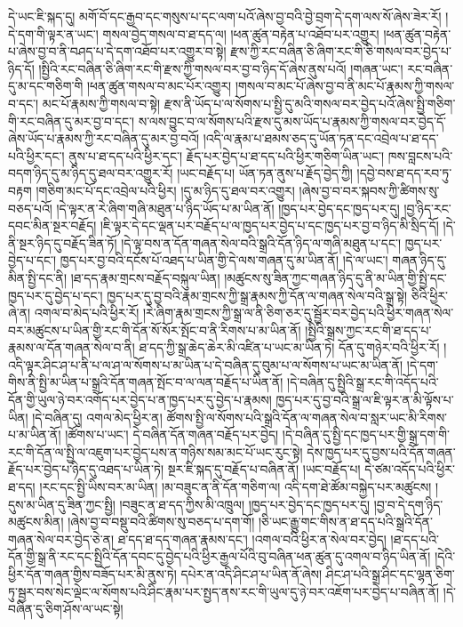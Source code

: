 དེ་ཡང་ཇི་སྐད་དུ། མགོ་བོ་དང་རྒྱབ་དང་གསུས་པ་དང་ལག་པའོ་ཞེས་བྱ་བའི་བྱེ་བྲག་དེ་དག་ལས་སོ་ཞེས་ཟེར་རོ། །དེ་དག་གི་ལྟར་ན་ཡང་། གསལ་བྱེད་གསལ་བ་ཐ་དད་ལ། །ཕན་ཚུན་བརྟེན་པ་འཐོབ་པར་འགྱུར། །ཕན་ཚུན་བརྟེན་པ་ཞེས་བྱ་བ་ནི་བཤད་པ་དེ་དག་འཐོབ་པར་འགྱུར་བ་སྟེ། རྫས་ཀྱི་རང་བཞིན་ཅི་ཞིག་རང་གི་ཅི་གསལ་བར་བྱེད་པ་ཉིད་དོ། །སྤྱིའི་རང་བཞིན་ཅི་ཞིག་རང་གི་རྫས་ཀྱི་གསལ་བར་བྱ་བ་ཉིད་དོ་ཞེས་ནུས་པའོ། །གཞན་ཡང་། རང་བཞིན་དུ་མ་དང་གཅིག་གི །ཕན་ཚུན་གསལ་བ་མང་པོར་འགྱུར། །གསལ་བ་མང་པོ་ཞེས་བྱ་བ་ནི་མང་པོ་རྣམས་ཀྱི་གསལ་བ་དང་། མང་པོ་རྣམས་ཀྱི་གསལ་བ་སྟེ། རྫས་ནི་ཡོད་པ་ལ་སོགས་པ་སྤྱི་དུ་མའི་གསལ་བར་བྱེད་པའོ་ཞེས་སྤྱི་གཅིག་གི་རང་བཞིན་དུ་མར་བྱ་བ་དང་། ས་ལས་བྱུང་བ་ལ་སོགས་པའི་རྫས་དུ་མས་ཡོད་པ་རྣམས་ཀྱི་གསལ་བར་བྱེད་དོ་ཞེས་ཡོད་པ་རྣམས་ཀྱི་རང་བཞིན་དུ་མར་བྱ་བའོ། །འདི་ལ་རྣམ་པ་ཐམས་ཅད་དུ་ཡོན་ཏན་དང་འབྲེལ་པ་ཐ་དད་པའི་ཕྱིར་དང་། ནུས་པ་ཐ་དད་པའི་ཕྱིར་དང་། རྗོད་པར་བྱེད་པ་ཐ་དད་པའི་ཕྱིར་གཅིག་ཡིན་ཡང་། ཁས་བླངས་པའི་བདག་ཉིད་དུ་མ་ཉིད་དུ་ཐལ་བར་འགྱུར་རོ། །ཡང་བརྗོད་པ། ཡོན་ཏན་ནུས་པ་རྗོད་བྱེད་ཀྱི། །དབྱེ་བས་ཐ་དད་རབ་ཏུ་བརྟག །གཅིག་མང་པོ་དང་འབྲེལ་པའི་ཕྱིར། །དུ་མ་ཉིད་དུ་ཐལ་བར་འགྱུར། །ཞེས་བྱ་བ་བར་སྐབས་ཀྱི་ཚིགས་སུ་བཅད་པའོ། །དེ་ལྟར་ན་རེ་ཞིག་གཞི་མཐུན་པ་ཉིད་ཡོད་པ་མ་ཡིན་ནོ། །ཁྱད་པར་བྱེད་དང་ཁྱད་པར་དུ། །བྱ་ཉིད་རང་དབང་མིན་སྔར་བརྗོད། །ཇི་ལྟར་དེ་དང་ལྡན་པར་བརྗོད་པ་ལ་ཁྱད་པར་བྱེད་པ་དང་ཁྱད་པར་བྱ་བ་ཉིད་མི་སྲིད་དོ། །དེ་ནི་སྔར་ཉིད་དུ་བརྗོད་ཟིན་ཏོ། །དེ་ལྟ་བས་ན་དོན་གཞན་སེལ་བའི་སྒྲའི་དོན་ཉིད་ལ་གཞི་མཐུན་པ་དང་། ཁྱད་པར་བྱེད་པ་དང་། ཁྱད་པར་བྱ་བའི་དངོས་པོ་འཐད་པ་ཡིན་གྱི་དེ་ལས་གཞན་དུ་མ་ཡིན་ནོ། །དེ་ལ་ཡང་། གཞན་ཉིད་དུ་མིན་སྤྱི་དང་ནི། །ཐ་དད་རྣམ་གྲངས་བརྗོད་བསྐུལ་ཡིན། །མཚུངས་སུ་ཟིན་ཀྱང་གཞན་ཉིད་དུ་ནི་མ་ཡིན་གྱི་སྤྱི་དང་ཁྱད་པར་དུ་བྱེད་པ་དང་། ཁྱད་པར་དུ་བྱ་བའི་རྣམ་གྲངས་ཀྱི་སྒྲ་རྣམས་ཀྱི་དོན་ལ་གཞན་སེལ་བའི་སྒྲ་སྟེ། ཅིའི་ཕྱིར་ཞེ་ན། འགལ་བ་མེད་པའི་ཕྱིར་རོ། །རེ་ཞིག་རྣམ་གྲངས་ཀྱི་སྒྲ་ལ་ནི་ཅིག་ཅར་དུ་སྦྱོར་བར་བྱེད་པའི་ཕྱིར་གཞན་སེལ་བར་མཚུངས་པ་ཡིན་གྱི་རང་གི་དོན་སོ་སོར་སྤོང་བ་ནི་རིགས་པ་མ་ཡིན་ནོ། །སྤྱིའི་སྒྲས་ཀྱང་རང་གི་ཐ་དད་པ་རྣམས་ལ་དོན་གཞན་སེལ་བ་ནི། ཐ་དད་ཀྱི་སྒྲ་ཆེད་ཆེར་མི་འཛིན་པ་ཡང་མ་ཡིན་ཏེ། དོན་དུ་གཉེར་བའི་ཕྱིར་རོ། །འདི་ལྟར་ཤིང་ཤ་པ་ནི་པ་ལ་ཤ་ལ་སོགས་པ་མ་ཡིན་པ་དེ་བཞིན་དུ་བུམ་པ་ལ་སོགས་པ་ཡང་མ་ཡིན་ནོ། །དེ་དག་གིས་ནི་སྤྱི་མ་ཡིན་པ་སྒྲའི་དོན་གཞན་སྤོང་བ་ལ་ལན་བརྗོད་པ་ཡིན་ནོ། །དེ་བཞིན་དུ་སྤྱིའི་སྒྲ་རང་གི་འདོད་པའི་དོན་གྱི་ཡུལ་ཉེ་བར་འགོད་པར་བྱེད་པ་ན་ཁྱད་པར་དུ་བྱེད་པ་རྣམས། ཁྱད་པར་དུ་བྱ་བའི་སྒྲ་ལ་ཇི་ལྟར་ན་མི་ལྟོས་པ་ཡིན། །དེ་བཞིན་དུ། འགལ་མེད་ཕྱིར་ན། ཚོགས་སྤྱི་ལ་སོགས་པའི་སྒྲའི་དོན་ལ་གཞན་སེལ་བ་སླར་ཡང་མི་རིགས་པ་མ་ཡིན་ནོ། །ཚོགས་པ་ཡང་། དེ་བཞིན་དོན་གཞན་བརྗོད་པར་བྱེད། །དེ་བཞིན་དུ་སྤྱི་དང་ཁྱད་པར་གྱི་སྒྲ་དག་གི་རང་གི་དོན་ལ་སྤྱི་ལ་འཇུག་པར་བྱེད་པས་ན་གཉིས་སམ་མང་པོ་ཡང་རུང་སྟེ། དེས་ཁྱད་པར་དུ་བྱས་པའི་དོན་གཞན་རྗོད་པར་བྱེད་པ་ཉིད་དུ་འཐད་པ་ཡིན་ཏེ། སྔར་ཇི་སྐད་དུ་བརྗོད་པ་བཞིན་ནོ། །ཡང་བརྗོད་པ། དེ་ཙམ་འདོད་པའི་ཕྱིར་ཐ་དད། །རང་དང་སྤྱི་ཡིས་བར་མ་ཡིན། །མ་བཟུང་ན་ནི་དོན་གཅིག་ལ། འདི་དག་ཐེ་ཚོམ་བསྐྱེད་པར་མཚུངས། །དུས་མ་ཡིན་དུ་ཟིན་ཀྱང་སྤྱི། །བཟུང་ན་ཐ་དད་ཀྱིས་མི་འཁྲུལ། །ཁྱད་པར་བྱེད་དང་ཁྱད་པར་དུ། །བྱ་བ་དེ་དག་ཉིད་མཚུངས་མིན། །ཞེས་བྱ་བ་བསྡུ་བའི་ཚིགས་སུ་བཅད་པ་དག་གོ། །ཅི་ཡང་རྒྱུ་གང་གིས་ན་ཐ་དད་པའི་སྒྲའི་དོན་གཞན་སེལ་བར་བྱེད་ཅེ་ན། ཐ་དད་ཐ་དད་གཞན་རྣམས་དང་། །འགལ་བའི་ཕྱིར་ན་སེལ་བར་བྱེད། །ཐ་དད་པའི་དོན་གྱི་སྒྲ་ནི་རང་དང་སྤྱིའི་དོན་དབང་དུ་བྱེད་པའི་ཕྱིར་རྒྱལ་པོའི་བུ་བཞིན་ཕན་ཚུན་དུ་འགལ་བ་ཉིད་ཡིན་ནོ། །དེའི་ཕྱིར་དོན་གཞན་གྱིས་བཟོད་པར་མི་ནུས་ཏེ། དཔེར་ན་འདི་ཤིང་ཤ་པ་ཡིན་ནོ་ཞེས། ཤིང་ཤ་པའི་སྒྲ་ཤིང་དང་ལྷན་ཅིག་ཏུ་སྦྱར་བས་སེང་ལྡེང་ལ་སོགས་པའི་ཤིང་རྣམ་པར་སྤྱད་ནས་རང་གི་ཡུལ་དུ་ཉེ་བར་འཇོག་པར་བྱེད་པ་བཞིན་ནོ། །དེ་བཞིན་དུ་ཅིག་ཤོས་ལ་ཡང་སྟེ། 